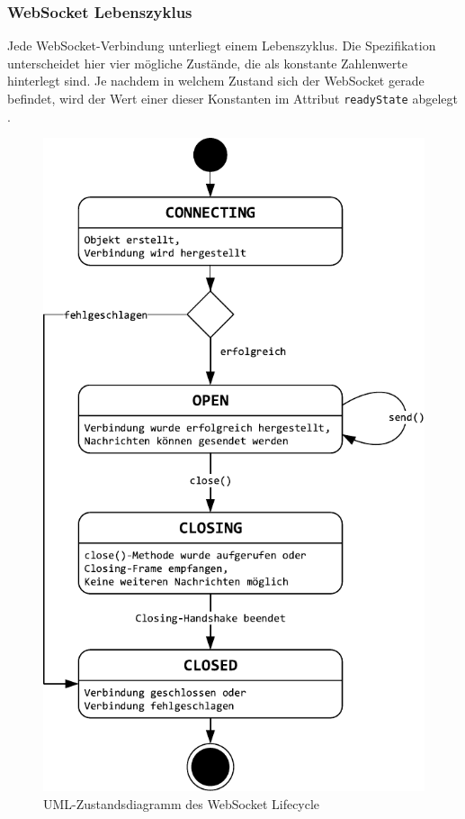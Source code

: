 \documentclass[11pt,a4paper,titlepage]{scrartcl}
\numberwithin{equation}{section}
\begin{document}
\subsubsection{WebSocket Lebenszyklus}
Jede WebSocket-Verbindung unterliegt einem Lebenszyklus. Die Spezifikation unterscheidet hier vier mögliche Zustände, die als konstante Zahlenwerte hinterlegt sind. Je nachdem in welchem Zustand sich der WebSocket gerade befindet, wird der Wert einer dieser Konstanten im Attribut \texttt{readyState} abgelegt \autocite{whatwg_html_2010}. \newpage
\begin{figure}[ht] \label{fig:wsLifeCycle}
	\begin{center}
		\includegraphics[scale=0.75]{img/wslifecycle.pdf}
		\caption{UML-Zustandsdiagramm des WebSocket Lifecycle}
		\label{fig:wsAPIZustand}
	\end{center}
\end{figure}
\end{document}
